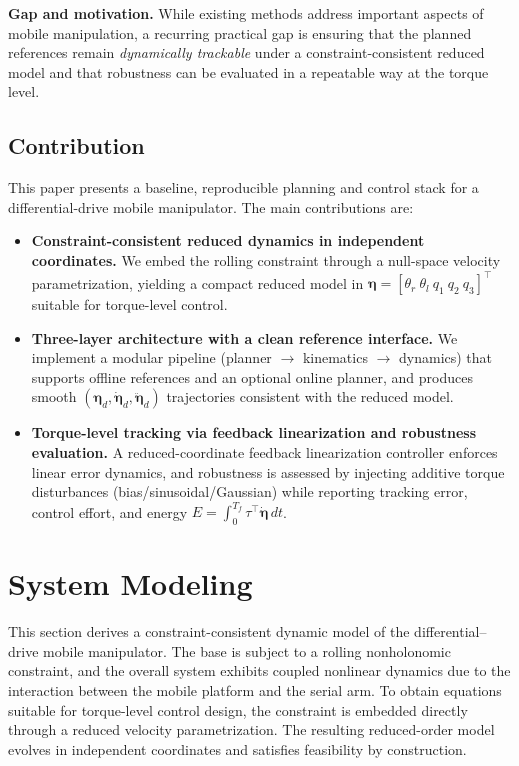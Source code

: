\documentclass[conference]{IEEEtran}
\newcommand{\etav}{\bm{\eta}}
\begin{document}
\noindent\textbf{Gap and motivation.}
While existing methods address important aspects of mobile manipulation, a recurring practical gap is ensuring that the planned references remain \emph{dynamically trackable} under a constraint-consistent reduced model and that robustness can be evaluated in a repeatable way at the torque level.

\subsection{Contribution}
This paper presents a baseline, reproducible planning and control stack for a differential-drive mobile manipulator. The main contributions are:
\begin{itemize}
  \item \textbf{Constraint-consistent reduced dynamics in independent coordinates.}
  We embed the rolling constraint through a null-space velocity parametrization, yielding a compact reduced model in
  $\etav=[\theta_r~\theta_l~q_1~q_2~q_3]^\top$ suitable for torque-level control.
  
  \item \textbf{Three-layer architecture with a clean reference interface.}
  We implement a modular pipeline (planner $\rightarrow$ kinematics $\rightarrow$ dynamics) that supports offline references and an optional online planner, and produces smooth $(\etav_d,\dot{\etav}_d,\ddot{\etav}_d)$ trajectories consistent with the reduced model.
  
  \item \textbf{Torque-level tracking via feedback linearization and robustness evaluation.}
  A reduced-coordinate feedback linearization controller enforces linear error dynamics, and robustness is assessed by injecting additive torque disturbances (bias/sinusoidal/Gaussian) while reporting tracking error, control effort, and energy
  $E=\int_{0}^{T_f}\tau^\top \dot{\etav}\,dt$.
\end{itemize}


\section{System Modeling}
\label{sec:system_modeling}

This section derives a constraint-consistent dynamic model of the differential--drive mobile manipulator. The base is subject to a rolling nonholonomic constraint, and the overall system exhibits coupled nonlinear dynamics due to the interaction between the mobile platform and the serial arm. To obtain equations suitable for torque-level control design, the constraint is embedded directly through a reduced velocity parametrization. The resulting reduced-order model evolves in independent coordinates and satisfies feasibility by construction.
\end{document}

